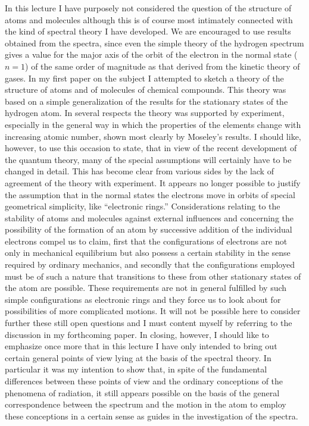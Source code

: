 In this lecture I have purposely not considered the question of
the structure of atoms and molecules although this is of course most
intimately connected with the kind of spectral theory I have developed.
We are encouraged to use results obtained from the spectra,
since even the simple theory of the hydrogen spectrum gives a
value for the major axis of the orbit of the electron in the normal
state ($n = 1$) of the same order of magnitude as that derived from
the kinetic theory of gases. In my first paper on the subject I
attempted to sketch a theory of the structure of atoms and of
molecules of chemical compounds. This theory was based on a
simple generalization of the results for the stationary states of the
hydrogen atom. In several respects the theory was supported by
experiment, especially in the general way in which the properties
of the elements change with increasing atomic number, shown most
clearly by Moseley's results. I should like, however, to use this
occasion to state, that in view of the recent development of the
quantum theory, many of the special assumptions will certainly have
to be changed in detail. This has become clear from various sides
by the lack of agreement of the theory with experiment. It appears
no longer possible to justify the assumption that in the normal
states the electrons move in orbits of special geometrical simplicity,
like ``electronic rings.'' Considerations relating to the stability of
atoms and molecules against external influences and concerning the
possibility of the formation of an atom by successive addition of
the individual electrons compel us to claim, first that the configurations
of electrons are not only in mechanical equilibrium
but also possess a certain stability in the sense required by
ordinary mechanics, and secondly that the configurations employed
must be of such a nature that transitions to these from other
stationary states of the atom are possible. These requirements are
not in general fulfilled by such simple configurations as electronic
rings and they force us to look about for possibilities of more complicated
motions. It will not be possible here to consider further
these still open questions and I must content myself by referring
to the discussion in my forthcoming paper. In closing, however,
I should like to emphasize once more that in this lecture I have
only intended to bring out certain general points of view lying at
the basis of the spectral theory. In particular it was my intention
to show that, in spite of the fundamental differences between these
points of view and the ordinary conceptions of the phenomena of
radiation, it still appears possible on the basis of the general correspondence
between the spectrum and the motion in the atom to
employ these conceptions in a certain sense as guides in the investigation
of the spectra.


